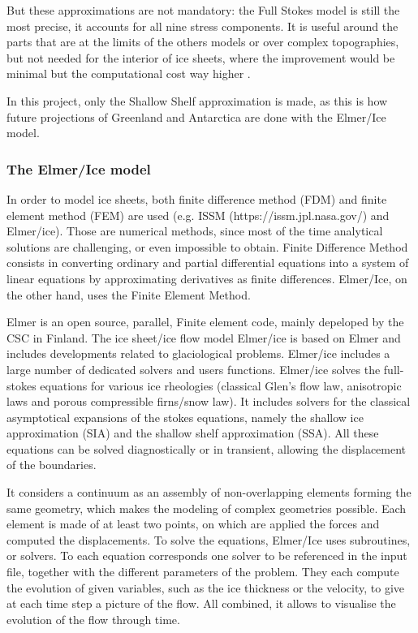\documentclass[a4paper,12pt]{article}
\begin{document}
But these approximations are not mandatory: the Full Stokes model is still the most precise, it accounts for all nine stress components. It is useful around the parts that are at the limits of the others models or over complex topographies, but not needed for the interior of ice sheets, where the improvement would be minimal but the computational cost way higher \cite[]{larour2012continental}.

In this project, only the Shallow Shelf approximation is made, as this is how future projections of Greenland and Antarctica are done with the Elmer/Ice model.
\subsubsection{The Elmer/Ice model}
In order to model ice sheets, both finite difference method (FDM) and finite element method (FEM) are used (e.g. ISSM (https://issm.jpl.nasa.gov/) and Elmer/ice). Those are numerical methods, since most of the time analytical solutions are challenging, or even impossible to obtain. Finite Difference Method consists in converting ordinary and partial differential equations into a system of linear equations by approximating derivatives as finite differences. Elmer/Ice, on the other hand, uses the Finite Element Method.

Elmer is an open source, parallel, Finite element code, mainly depeloped by the CSC in Finland. The ice sheet/ice flow model Elmer/ice is based on Elmer and includes developments related to glaciological problems. Elmer/ice includes a large number of dedicated solvers and users functions.
Elmer/ice solves the full-stokes equations for various ice rheologies (classical  Glen's flow law, anisotropic laws and porous compressible firns/snow law). It includes solvers for the classical asymptotical expansions of the stokes equations, namely the shallow 	ice approximation (SIA) and the shallow shelf approximation (SSA). All these equations can be solved diagnostically or in transient, allowing the displacement of the boundaries. 

It considers a continuum as an assembly of non-overlapping elements forming the same geometry, which makes the modeling of complex geometries possible. Each element is made of at least two points, on which are applied the forces and computed the displacements. To solve the equations, Elmer/Ice uses subroutines, or solvers. To each equation corresponds one solver to be referenced in the input file, together with the different parameters of the problem. They each compute the evolution of given variables, such as the ice thickness or the velocity, to give at each time step a picture of the flow. All combined, it allows to visualise the evolution of the flow through time.
\end{document}
